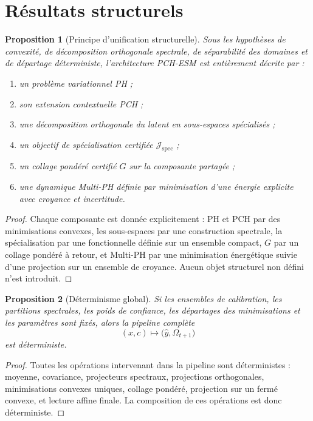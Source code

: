\documentclass[11pt,a4paper]{article}
\newtheorem{proposition}{Proposition}[section]
\newcommand{\1}{\mathbf 1}
\begin{document}
\section{Résultats structurels}

\begin{proposition}[Principe d'unification structurelle]
Sous les hypothèses de convexité, de décomposition orthogonale spectrale, de séparabilité des domaines et de départage déterministe, l'architecture PCH-ESM est entièrement décrite par :
\begin{enumerate}[leftmargin=2em]
    \item un problème variationnel PH ;
    \item son extension contextuelle PCH ;
    \item une décomposition orthogonale du latent en sous-espaces spécialisés ;
    \item un objectif de spécialisation certifiée \(\mathcal J_{\mathrm{spec}}\) ;
    \item un collage pondéré certifié \(G\) sur la composante partagée ;
    \item une dynamique Multi-PH définie par minimisation d'une énergie explicite avec croyance et incertitude.
\end{enumerate}
\end{proposition}

\begin{proof}
Chaque composante est donnée explicitement : PH et PCH par des minimisations convexes, les sous-espaces par une construction spectrale, la spécialisation par une fonctionnelle définie sur un ensemble compact, \(G\) par un collage pondéré à retour, et Multi-PH par une minimisation énergétique suivie d'une projection sur un ensemble de croyance.  
Aucun objet structurel non défini n'est introduit.
\end{proof}

\begin{proposition}[Déterminisme global]
Si les ensembles de calibration, les partitions spectrales, les poids de confiance, les départages des minimisations et les paramètres sont fixés, alors la pipeline complète
\[
(x,c)\longmapsto \bigl(\hat y,\Omega_{t+1}\bigr)
\]
est déterministe.
\end{proposition}

\begin{proof}
Toutes les opérations intervenant dans la pipeline sont déterministes : moyenne, covariance, projecteurs spectraux, projections orthogonales, minimisations convexes uniques, collage pondéré, projection sur un fermé convexe, et lecture affine finale.  
La composition de ces opérations est donc déterministe.
\end{proof}
\end{document}
